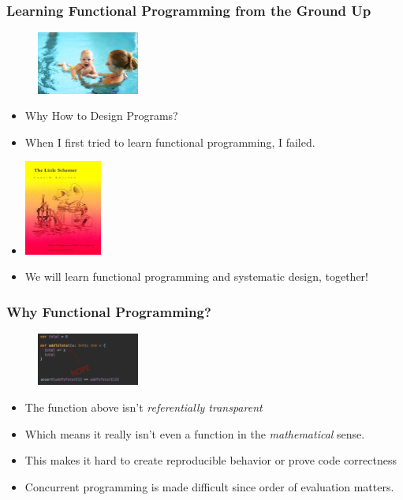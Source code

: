 \documentclass{beamer}
\begin{document}
\begin{frame}
  \frametitle{Learning Functional Programming from the Ground Up}
  \begin{figure}[t]
    \centering \includegraphics[width=0.3\textwidth]{images/pool-baby.jpeg}
  \end{figure}
  \begin{itemize}
  \item<2-> Why How to Design Programs?
  \item<3-> When I first tried to learn functional programming, I failed.
  \item<4-> \includegraphics[width=0.2\textwidth]{images/little-schemer.jpg}
  \item<5-> We will learn functional programming and systematic design, together!
  \end{itemize}  
\end{frame}

\begin{frame}
  \frametitle{Why Functional Programming?}
  \begin{figure}[t]
    \centering \includegraphics[width=0.3\textwidth]{images/referential-transparency.png}
  \end{figure}
  \begin{itemize}
  \item<2-> The function above isn't \emph{referentially transparent}
  \item<3-> Which means it really isn't even a function in the \emph{mathematical} sense.
  \item<4-> This makes it hard to create reproducible behavior or prove code correctness
  \item<5-> Concurrent programming is made difficult since order of evaluation matters.
  \end{itemize}
\end{frame}
\end{document}
